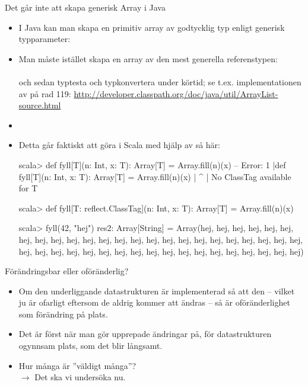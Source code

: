 \begin{Slide}{Det går inte att skapa generisk Array i Java}\SlideFontTiny
\begin{itemize}
\item I Java kan man  skapa en primitiv array av godtycklig typ enligt generisk typparameter: \sout{}

\item Man måste istället skapa en array av den mest generella referenstypen: \\
 \\
och sedan typtesta och typkonvertera under körtid; se t.ex. implementationen av  på rad 119: \href{http://developer.classpath.org/doc/java/util/ArrayList-source.html}{http://developer.classpath.org/doc/java/util/ArrayList-source.html}

\item[]
\pause
\item Detta går faktiskt att göra i Scala med hjälp av  \pause så här: \\
\begin{REPLsmall}
scala> def fyll[T](n: Int, x: T): Array[T] = Array.fill(n)(x)
-- Error:
1 |def fyll[T](n: Int, x: T): Array[T] = Array.fill(n)(x)
  |                                                      ^
  |  No ClassTag available for T

scala> def fyll[T: reflect.ClassTag](n: Int, x: T): Array[T] = Array.fill(n)(x)

scala> fyll(42, "hej")
res2: Array[String] = Array(hej, hej, hej, hej, hej, hej, hej, hej, hej, hej, hej, hej, hej, hej, hej, hej, hej, hej, hej, hej, hej, hej, hej, hej, hej, hej, hej, hej, hej, hej, hej, hej, hej, hej, hej, hej, hej, hej, hej, hej, hej, hej)

\end{REPLsmall}


\end{itemize}


\end{Slide}




\begin{Slide}{Förändringsbar eller oföränderlig?}
\begin{itemize}
\item Om den underliggande  datastrukturen är  implementerad så att den  -- vilket ju är ofarligt eftersom de aldrig kommer att ändras -- så är oföränderlighet  som förändring på plats.

\item Det är först när man gör  upprepade ändringar på, för datastrukturen ogynnsam plats, som det blir långsamt.

\item Hur många är ''väldigt många''?  \\ \pause $\rightarrow$ Det ska vi undersöka nu.

\end{itemize}
\end{Slide}

